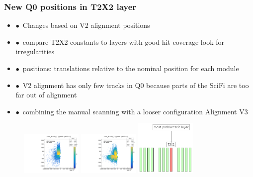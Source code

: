 \documentclass[aspectratio=1610, 12pt, xcolor=dvipsnames]{beamer}
\begin{document}
\begin{frame}\frametitle{New Q0 positions in T2X2 layer}
  \begin{itemize}
    \item $\bullet$\, Changes based on V2 alignment positions
    \item $\bullet$\, compare T2X2 constants to layers with good hit coverage \to look for irregularities
    \item $\bullet$\, positions: translations relative to the nominal position for each module
    \item $\bullet$\, V2 alignment has only few tracks in Q0 because parts of the SciFi are too far out of alignment
    \item $\bullet$\, combining the manual scanning with a looser configuration \to Alignment V3
  \end{itemize}
  \begin{figure}
    \includegraphics[width=0.26\textwidth]{logos/2D_nodeXY_v2_7_left.pdf}%
    \includegraphics[width=0.26\textwidth]{logos/2D_nodeXY_quartermean_7_left.pdf}%
    \includegraphics[width=0.26\textwidth]{problem_layer.png}%
  \end{figure}
\end{frame}
\end{document}
